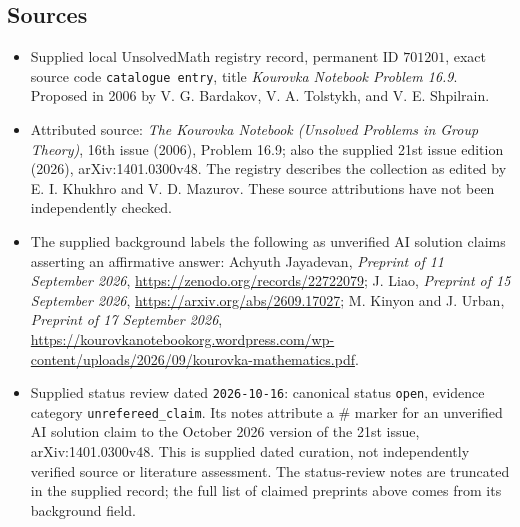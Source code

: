 \documentclass[11pt]{article}
\begin{document}
\subsection{Sources}
\begin{itemize}
\item Supplied local UnsolvedMath registry record, permanent ID \(701201\), exact source code \texttt{catalogue entry}, title \emph{Kourovka Notebook Problem 16.9}. Proposed in 2006 by V. G. Bardakov, V. A. Tolstykh, and V. E. Shpilrain.
\item Attributed source: \emph{The Kourovka Notebook (Unsolved Problems in Group Theory)}, 16th issue (2006), Problem 16.9; also the supplied 21st issue edition (2026), arXiv:1401.0300v48. The registry describes the collection as edited by E. I. Khukhro and V. D. Mazurov. These source attributions have not been independently checked.
\item The supplied background labels the following as unverified AI solution claims asserting an affirmative answer: Achyuth Jayadevan, \emph{Preprint of 11 September 2026}, \url{https://zenodo.org/records/22722079}; J. Liao, \emph{Preprint of 15 September 2026}, \url{https://arxiv.org/abs/2609.17027}; M. Kinyon and J. Urban, \emph{Preprint of 17 September 2026}, \url{https://kourovkanotebookorg.wordpress.com/wp-content/uploads/2026/09/kourovka-mathematics.pdf}.
\item Supplied status review dated \texttt{2026-10-16}: canonical status \texttt{open}, evidence category \texttt{unrefereed\_claim}. Its notes attribute a \# marker for an unverified AI solution claim to the October 2026 version of the 21st issue, arXiv:1401.0300v48. This is supplied dated curation, not independently verified source or literature assessment. The status-review notes are truncated in the supplied record; the full list of claimed preprints above comes from its background field.
\end{itemize}
\end{document}
